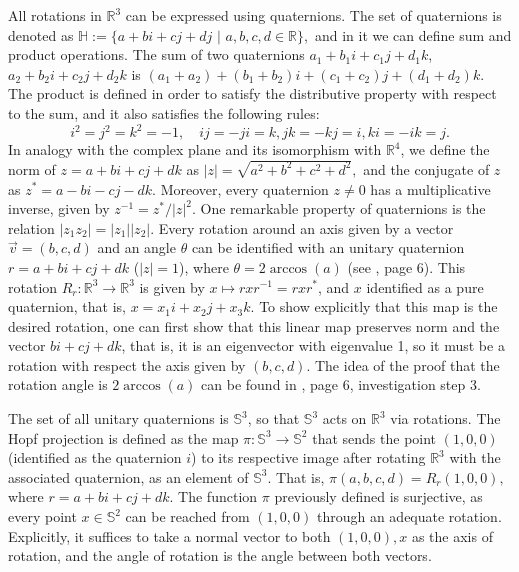 \documentclass[12pt, letterpaper, reqno]{amsart}
\theoremstyle{definition}
\theoremstyle{plain}
\theoremstyle{remark}
\begin{document}
All rotations in $ \mathbb{R}^3 $ can be expressed using quaternions. The set of quaternions is denoted as $ \mathbb{H} := \{ a+bi+cj+dj$  $|$  $a,b,c,d\in \mathbb{R} \}, $ and in it we can define sum and product operations. The sum of two quaternions $ a_1+b_1 i +c_1 j  + d_1k $, $ a_2+b_2 i +c_2 j  + d_2k $ is $ (a_1+a_2)+(b_1+b_2)i+(c_1+c_2)j+(d_1+d_2)k. $ The product is defined in order to satisfy the distributive property with respect to the sum, and it also satisfies the following rules: 
$$ i^2=j^2=k^2=-1, \quad ij=-ji=k, jk=-kj=i, ki = -ik=j.  $$ 
In analogy with the complex plane and its isomorphism with $\mathbb{R}^4$, we define the norm of $ z= a+bi+cj+dk $ as $ |z|=\sqrt{a^2+b^2+c^2+d^2}, $ and the conjugate of $ z $ as $ z^* = a-bi-cj-dk. $ Moreover, every quaternion $ z\neq 0 $ has a multiplicative inverse, given by $ z^{-1} = z^*/|z|^2. $ One remarkable property of quaternions is the relation $ |z_1 z_2| = |z_1||z_2|. $  Every rotation around an axis given by a vector $ \vec{v}=(b,c,d) $ and an angle $ \theta $ can be identified with an unitary quaternion $r = a+bi+cj+dk$ ($|z|=1$),  where $ \theta = 2\arccos(a) $ (see \cite{lyons2003elementary}, page 6). This rotation $ R_r: \mathbb{R}^3 \rightarrow\mathbb{R}^3 $ is given by $ x\mapsto rxr^{-1}= rxr^*$, and $ x $ identified as a pure quaternion, that is, $ x=x_1i+x_2j+x_3k. $ To show explicitly that this map is the desired rotation, one can first show that this linear map preserves norm and the vector $ bi+cj+dk $, that is, it is an eigenvector with eigenvalue 1, so it must be a rotation with respect the axis given by $ (b,c,d) $. The idea of the proof that the rotation angle is $ 2\arccos(a) $ can be found in \cite{lyons2003elementary}, page 6, investigation step 3. 

The set of all unitary quaternions is $ \mathbb{S}^3 $, so that $ \mathbb{S}^3 $ acts on $ \mathbb{R}^3 $ via rotations. The Hopf projection is defined as the map $ \pi: \mathbb{S}^3 \rightarrow \mathbb{S}^2 $ that sends the point $ (1,0,0) $ (identified as the quaternion $ i $)   to its respective image after rotating $ \mathbb{R}^3 $ with the associated quaternion, as an element of $ \mathbb{S}^3 $. That is, $ \pi(a,b,c,d) = R_r(1,0,0), $ where $ r=a+bi+cj+dk. $  The function $ \pi $ previously defined is surjective, as every point $ x\in\mathbb{S}^2 $ can be reached from $ (1,0,0) $ through an adequate rotation. Explicitly, it suffices to take a normal vector to both $ (1,0,0), x $ as the axis of rotation, and the angle of rotation is the angle between both vectors. 
\end{document}
